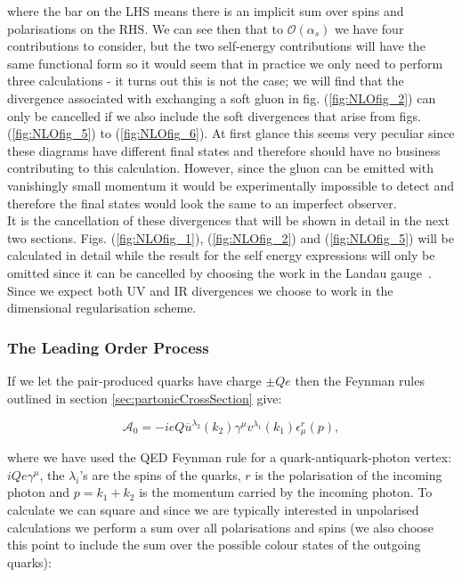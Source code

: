 		where the bar on the LHS means there is an implicit sum over spins and polarisations on the RHS.  We can see then that to
		$\mathcal{O}(\alpha_s)$ we have four contributions to consider, but the two self-energy contributions will have the same
		functional form so it would seem that in practice we only need to perform three calculations - it turns out this is not the case;
		we will find that the divergence associated with exchanging a soft gluon in fig. (\ref{fig:NLOfig_2}) can only be cancelled
		if we also include the soft divergences that arise from figs. (\ref{fig:NLOfig_5}) to (\ref{fig:NLOfig_6}).  At first glance this
		seems very peculiar since these diagrams have different final states and therefore should have no business contributing to this
		calculation.  However, since the gluon can be emitted with vanishingly small momentum it would be experimentally impossible to
		detect and therefore the final states would look the same to an imperfect observer.\\It is the cancellation of these divergences
		that will be shown in detail in the next two sections.  Figs. (\ref{fig:NLOfig_1}), (\ref{fig:NLOfig_2}) and (\ref{fig:NLOfig_5})
		will be calculated in detail while the result for the self energy expressions will only be omitted since it can be cancelled by
		choosing the work in the Landau gauge~\cite{fieldBook}.  Since we expect both UV and IR divergences we choose to work in the dimensional
		regularisation scheme.

		\subsubsection{The Leading Order Process}

			If we let the pair-produced quarks have charge $\pm Qe$ then the Feynman rules outlined in section \ref{sec:partonicCrossSection} give:

			\begin{equation}
				\mathcal{A}_0 = -ieQ\overline{u}^{\lambda_2}(k_2)\gamma^\mu v^{\lambda_1}(k_1)\epsilon^r_\mu(p),
			\end{equation}

			where we have used the QED Feynman rule for a quark-antiquark-photon vertex: $iQe\gamma^\mu$, the $\lambda_i$'s are the
			spins of the quarks, $r$ is the polarisation of the incoming photon and $p = k_1 + k_2$ is the momentum carried by the
			incoming photon.  To calculate we can square and since we are typically interested in unpolarised calculations we perform
			a sum over all polarisations and spins (we also choose this point to include the sum over the possible colour states of
			the outgoing quarks):

